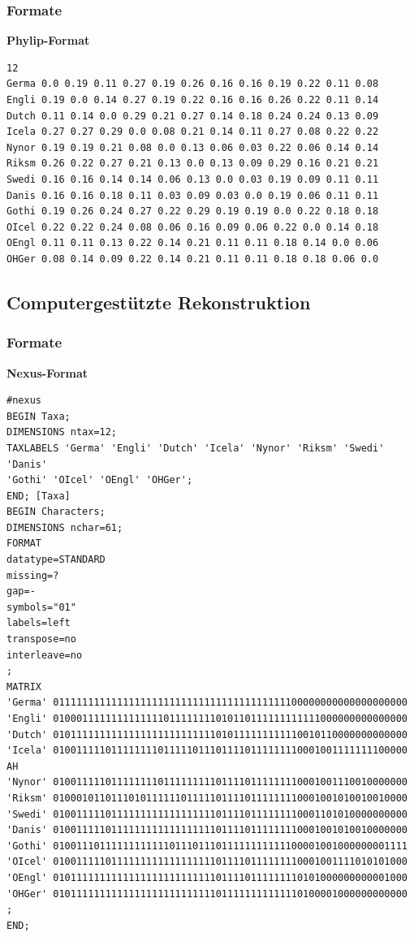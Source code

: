 \subsubsection{\texorpdfstring{{Formate}}{Formate}}

\textbf{Phylip-Format}

\begin{verbatim}
12
Germa 0.0 0.19 0.11 0.27 0.19 0.26 0.16 0.16 0.19 0.22 0.11 0.08
Engli 0.19 0.0 0.14 0.27 0.19 0.22 0.16 0.16 0.26 0.22 0.11 0.14
Dutch 0.11 0.14 0.0 0.29 0.21 0.27 0.14 0.18 0.24 0.24 0.13 0.09
Icela 0.27 0.27 0.29 0.0 0.08 0.21 0.14 0.11 0.27 0.08 0.22 0.22
Nynor 0.19 0.19 0.21 0.08 0.0 0.13 0.06 0.03 0.22 0.06 0.14 0.14
Riksm 0.26 0.22 0.27 0.21 0.13 0.0 0.13 0.09 0.29 0.16 0.21 0.21
Swedi 0.16 0.16 0.14 0.14 0.06 0.13 0.0 0.03 0.19 0.09 0.11 0.11
Danis 0.16 0.16 0.18 0.11 0.03 0.09 0.03 0.0 0.19 0.06 0.11 0.11
Gothi 0.19 0.26 0.24 0.27 0.22 0.29 0.19 0.19 0.0 0.22 0.18 0.18
OIcel 0.22 0.22 0.24 0.08 0.06 0.16 0.09 0.06 0.22 0.0 0.14 0.18
OEngl 0.11 0.11 0.13 0.22 0.14 0.21 0.11 0.11 0.18 0.14 0.0 0.06
OHGer 0.08 0.14 0.09 0.22 0.14 0.21 0.11 0.11 0.18 0.18 0.06 0.0
\end{verbatim}

\subsection{\texorpdfstring{{Computergestützte
Rekonstruktion}}{Computergestützte Rekonstruktion}}

\subsubsection{\texorpdfstring{{Formate}}{Formate}}

\textbf{Nexus-Format}

\begin{verbatim}
#nexus
BEGIN Taxa;
DIMENSIONS ntax=12;
TAXLABELS 'Germa' 'Engli' 'Dutch' 'Icela' 'Nynor' 'Riksm' 'Swedi' 'Danis'
'Gothi' 'OIcel' 'OEngl' 'OHGer';
END; [Taxa]
BEGIN Characters;
DIMENSIONS nchar=61;
FORMAT
datatype=STANDARD
missing=?
gap=-
symbols="01"
labels=left
transpose=no
interleave=no
;
MATRIX
'Germa' 0111111111111111111111111111111111111111100000000000000000000
'Engli' 0100011111111111111011111111010110111111111111000000000000000
'Dutch' 0101111111111111111111111111010111111111110010110000000000000
'Icela' 0100111110111111110111110111011110111111110001001111111100000
AH
'Nynor' 0100111110111111110111111111011110111111110001001110010000000
'Riksm' 0100010110111010111111011111011110111111110001001010010010000
'Swedi' 0100111110111111111111111111011110111111110001101010000000000
'Danis' 0100111110111111111111111111011110111111110001001010010000000
'Gothi' 0100111011111111111101110111011111111111100001001000000001111
'OIcel' 0100111110111111111111111111011110111111110001001111010101000
'OEngl' 0101111111111111111111111111011110111111110101000000000001000
'OHGer' 0101111111111111111111111111011111111111110100001000000000000
;
END;
\end{verbatim}

